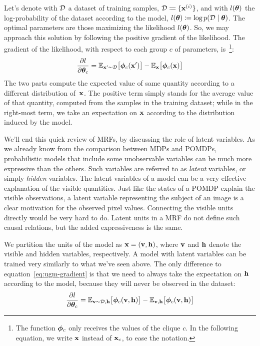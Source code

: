 Let's denote with $\mathcal{D}$ a dataset of training samples, $\mathcal{D}
\coloneqq \{\mathbf{x}^{(i)}\}$, and with $l(\bm{\theta})$ the log-probability of the
dataset according to the model, $l(\bm{\theta}) \coloneqq \log p(\mathcal{D} \mid
\bm{\theta})$. The optimal parameters are those maximizing the likelihood
$l(\bm{\theta})$. So, we may approach this solution by following the positive
gradient of the likelihood. The gradient of the likelihood, with respect to
each group $c$ of parameters, is~\footnote{ The function $\bm{\phi}_c$ only
receives the values of the clique $c$.  In the following equation, we write
$\mathbf{x}$ instead of $\mathbf{x}_c$, to ease the notation.}:
\begin{equation}
	\frac{\partial l}{\partial \bm{\theta}_c} = \mathbb{E}_{\mathbf{x}' \sim \mathcal{D}}
	\bigl[\bm{\phi}_c(\mathbf{x}') \bigr] - \mathbb{E}_{\mathbf{x}} \bigl[\bm{\phi}_c(\mathbf{x}) \bigr]
	\label{eq:ugm-gradient}
\end{equation}
The two parts compute the expected value of same quantity according to a
different distribution of~$\mathbf{x}$. The positive term simply stands for the
average value of that quantity, computed from the samples in the training
dataset; while in the right-most term, we take an expectation on $\mathbf{x}$
according to the distribution induced by the model.

We'll end this quick review of MRFs, by discussing the role of latent
variables. As we already know from the comparison between MDPs and POMDPs,
probabilistic models that include some unobservable variables can be much more
expressive than the others. Such variables are referred to as \emph{latent}
variables, or simply \emph{hidden} variables. The latent variables of a model
can be a very effective explanation of the visible quantities. Just like
the states of a POMDP explain the visible observations, a latent variable
representing the subject of an image is a clear motivation for the observed
pixel values. Connecting the visible units directly would be very hard to do.
Latent units in a MRF do not define such causal relations, but the added
expressiveness is the same.

We partition the units of the model as $\mathbf{x} = (\mathbf{v}, \mathbf{h})$, where $\mathbf{v}$ and
$\mathbf{h}$ denote the visible and hidden variables, respectively. A model with
latent variables can be trained very similarly to what we've seen above. The
only difference to equation~\eqref{eq:ugm-gradient} is that we need to always
take the expectation on $\mathbf{h}$ according to the model, because they will never
be observed in the dataset:
\begin{equation}
	\frac{\partial l}{\partial \bm{\theta}_c} = \mathbb{E}_{\mathbf{v} \sim \mathcal{D},\mathbf{h}}
	\bigl[\bm{\phi}_c(\mathbf{v}, \mathbf{h})\bigr] - \mathbb{E}_{\mathbf{v},\mathbf{h}} \bigl[\bm{\phi}_c(\mathbf{v},
	\mathbf{h})\bigr]
	\label{eq:ugm-po-gradient}
\end{equation}



